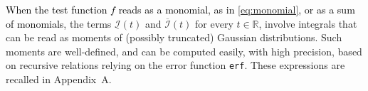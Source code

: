 \documentclass[review]{elsarticle}
\newcommand{\cblue}{\textcolor{black}}
\newcommand{\E}{\mathrm{E}}
\newcommand{\Ic}{\mathcal{I}}
\newcommand{\bR}{\mathbb{R}}
\newcommand{\emilie}[1]{\textcolor{magenta}{\textbf{[{\em EMILIE SAYS}: #1]}}}
\newcommand{\victor}[1]{\textcolor{blue}{\textbf{[{\em VICTOR SAYS}: #1]}}}
\newcommand{\solal}[1]{\textcolor{green}{\textbf{[{\em SOLAL SAYS}: #1]}}}
\begin{document}



\cblue{When the test function $f$ reads as a monomial, as in \eqref{eq:monomial}, or as a sum of monomials}, the terms $\underline{\Ic}(t)$ and $\overline{\Ic}(t)$ for every $t \in \mathbb{R}$, involve integrals that can be read as moments of (possibly truncated) Gaussian distributions. Such moments are well-defined, and can be computed easily, with high precision, based on recursive relations relying on the error function \texttt{erf}. These expressions are recalled in Appendix~A.
\end{document}
